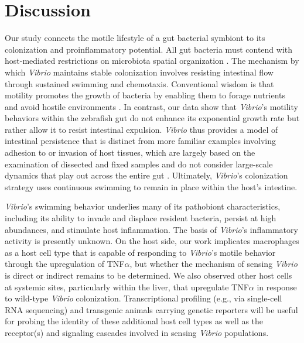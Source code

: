 \section{Discussion}
Our study connects the motile lifestyle of a gut bacterial symbiont to its colonization and proinflammatory potential. All gut bacteria must contend with host-mediated restrictions on microbiota spatial organization \cite{donaldson_gut_2015,tropini_gut_2017,byndloss_healthy_2018}. The mechanism by which \textit{Vibrio} maintains stable colonization involves resisting intestinal flow through sustained swimming and chemotaxis. Conventional wisdom is that motility promotes the growth of bacteria by enabling them to forage nutrients and avoid hostile environments \cite{wei_population_2011,stecher_motility_2008,rivera-chavez_energy_2016}. In contrast, our data show that \textit{Vibrio}'s motility behaviors within the zebrafish gut do not enhance its exponential growth rate but rather allow it to resist intestinal expulsion. \textit{Vibrio} thus provides a model of intestinal persistence that is distinct from more familiar examples involving adhesion to or invasion of host tissues, which are largely based on the examination of dissected and fixed samples and do not consider large-scale dynamics that play out across the entire gut \cite{mcloughlin_host_2016,schluter_adhesion_2015,donaldson_gut_2018}. Ultimately, \textit{Vibrio}'s colonization strategy uses continuous swimming to remain in place within the host's intestine.

\textit{Vibrio}'s swimming behavior underlies many of its pathobiont characteristics, including its ability to invade and displace resident bacteria, persist at high abundances, and stimulate host inflammation. The basis of \textit{Vibrio}'s inflammatory activity is presently unknown. On the host side, our work implicates macrophages as a host cell type that is capable of responding to \textit{Vibrio}'s motile behavior through the upregulation of TNF$\alpha$, but whether the mechanism of sensing \textit{Vibrio} is direct or indirect remains to be determined. We also observed other host cells at systemic sites, particularly within the liver, that upregulate TNF$\alpha$ in response to wild-type \textit{Vibrio} colonization. Transcriptional profiling (e.g., via single-cell RNA sequencing) and transgenic animals carrying genetic reporters will be useful for probing the identity of these additional host cell types as well as the receptor(s) and signaling cascades involved in sensing \textit{Vibrio} populations.  

